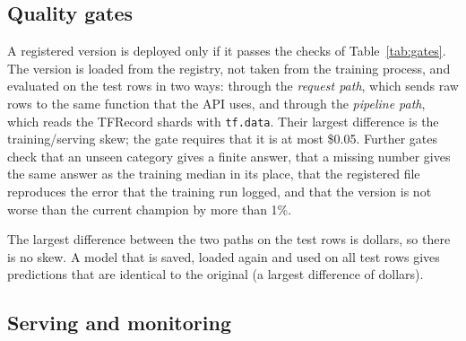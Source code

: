 \begin{table}[!htbp]
\centering
\small

\caption{Test error by \texttt{ocean\_proximity}. The mean error is the mean of prediction minus actual value.}
\label{tab:errocean}
\end{table}

\begin{table}[!htbp]
\centering
\small

\caption{Test error by income band (median income in tens of thousands of dollars).}
\label{tab:errincome}
\end{table}

\subsection{Quality gates}

A registered version is deployed only if it passes the checks of Table~\ref{tab:gates}. The version is loaded from the registry, not taken from the training process, and evaluated on the test rows in two ways: through the \emph{request path}, which sends raw rows to the same function that the API uses, and through the \emph{pipeline path}, which reads the TFRecord shards with \texttt{tf.data}. Their largest difference is the training/serving skew; the gate requires that it is at most \$0.05. Further gates check that an unseen category gives a finite answer, that a missing number gives the same answer as the training median in its place, that the registered file reproduces the error that the training run logged, and that the version is not worse than the current champion by more than 1\%.

\begin{table}[!htbp]
\centering
\small

\caption{Quality gates for the deployed version. The thresholds are choices of the project (Section~\ref{sec:limits}), not content of the book.}
\label{tab:gates}
\end{table}

The largest difference between the two paths on the test rows is  dollars, so there is no skew. A model that is saved, loaded again and used on all test rows gives predictions that are identical to the original (a largest difference of  dollars).

\subsection{Serving and monitoring}

